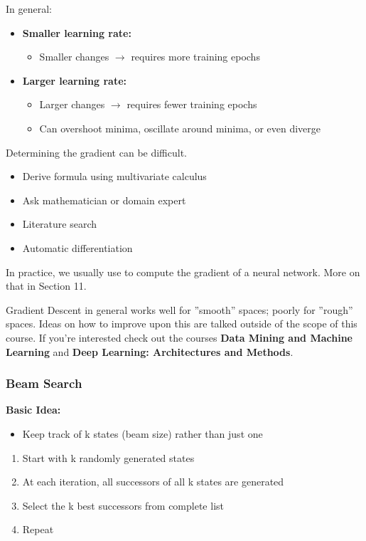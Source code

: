 \documentclass[
../EiKI_Summary.tex,
]
{subfiles}
\begin{document}
In general:
\begin{itemize}
    \item \textbf{Smaller learning rate:}
    \begin{itemize}
        \item Smaller changes $\rightarrow$ requires more training epochs
    \end{itemize}
    \item \textbf{Larger learning rate:}
    \begin{itemize}
        \item Larger changes $\rightarrow$ requires fewer training epochs
        \item Can overshoot minima, oscillate around minima, or even diverge
    \end{itemize}
\end{itemize}

Determining the gradient can be difficult.
\begin{itemize}
    \item Derive formula using multivariate calculus
    \item Ask mathematician or domain expert
    \item Literature search
    \item Automatic differentiation
\end{itemize}

In practice, we usually use  to compute the gradient of a neural network. More on that in Section 11.

Gradient Descent in general works well for ''smooth'' spaces; poorly for ''rough'' spaces. Ideas on how to improve upon this are talked outside of the scope of this course. If you're interested check out the courses \textbf{Data Mining and Machine Learning} and \textbf{Deep Learning: Architectures and Methods}.

\subsubsection{Beam Search}
\textbf{Basic Idea:}
\begin{itemize}
    \item Keep track of k states (beam size) rather than just one
\end{itemize}
\begin{enumerate}
    \item Start with k randomly generated states
    \item At each iteration, all successors of all k states are generated
    \item Select the k best successors from complete list
    \item Repeat
\end{enumerate}
\end{document}

